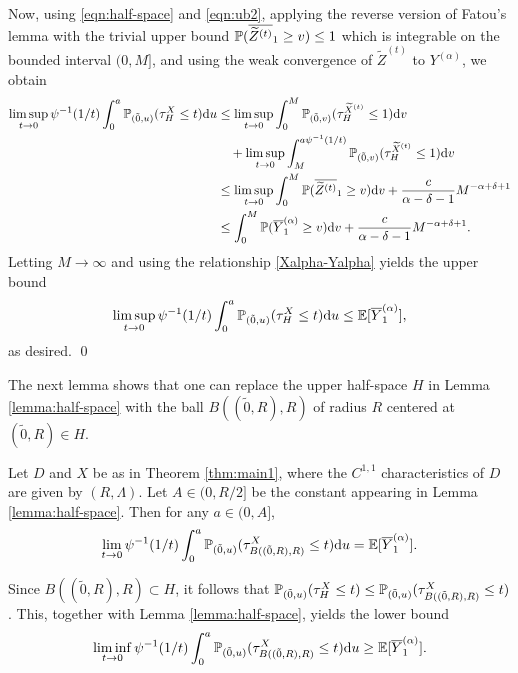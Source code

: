 \documentclass[11pt]{article}
\begin{document}
\begin{doublespace}
Now, using \eqref{eqn:half-space} and \eqref{eqn:ub2}, applying the reverse version of Fatou's lemma with the trivial upper bound $\P(\overline{\widetilde{Z}^{(t)}}_1\geq v)\leq 1$ which is integrable on the bounded interval $(0,M]$, and using the weak convergence of $\widetilde{Z}^{(t)}$ to $Y^{(\alpha)}$, we obtain
\begin{align*}
\limsup_{t\to 0}\psi^{-1}(1/t)\int_{0}^{a}\P_{(\tilde{0},u)}(\tau_{H}^X \leq t)\ud u
&\le \limsup_{t\to 0}\int_0^{M}\P_{(\tilde{0},v)}(\tau_{H}^{\widetilde{X}^{(t)}}\leq  1)\ud v\\ 
&\quad +\limsup_{t\to 0}\int_{M}^{a\psi^{-1}(1/t)}\P_{(\tilde{0},v)}(\tau_{H}^{\widetilde{X}^{(t)}}\leq  1)\ud v\\
&\le\limsup_{t\to 0} \int_{0}^{M}\P(\overline{\widetilde{Z}^{(t)}}_1\geq v)\ud v +\frac{c}{\alpha-\delta-1}M^{-\alpha+\delta+1}\\
&\le\int_{0}^{M}\P(\overline{Y}_{1}^{(\alpha)}\geq v)\ud v +\frac{c}{\alpha-\delta-1}M^{-\alpha+\delta+1}.
\end{align*}
Letting $M\to \infty$ and using the relationship \eqref{Xalpha-Yalpha} yields the upper bound
\begin{align*}
\limsup_{t\to 0}\psi^{-1}(1/t)\int_{0}^{a}\P_{(\tilde{0},u)}(\tau_{H}^X\leq t)\ud u\leq \E[\overline{Y}_{1}^{(\alpha)}],
\end{align*}
as desired.
\qed


The next lemma shows that one can replace the upper half-space $H$ in Lemma \ref{lemma:half-space} with the ball $B((\tilde{0},R),R)$ of radius $R$ centered at $(\tilde{0},R)\in H$. 
\begin{lemma}\label{lemma:ball}
Let $D$ and $X$ be as in Theorem \ref{thm:main1}, where the $C^{1,1}$ characteristics of $D$ are given by $(R,\Lambda)$. 
Let $A\in(0,R/2]$ be the constant appearing in Lemma \ref{lemma:half-space}.
Then for any $a\in(0, A ]$,
\[
\lim_{t\to 0}\psi^{-1}(1/t)\int_{0}^{a}\P_{(\tilde{0},u)}(\tau^{X}_{B((\tilde{0},R),R)}\leq t)\ud u=\E[\overline{Y}^{(\alpha)}_{1}].
\]
\end{lemma}
\pf
Since $B((\tilde{0},R),R)\subset H$, it follows that $\P_{(\tilde{0},u)}(\tau_{H}^X\leq t) \leq \P_{(\tilde{0},u)}(\tau^{X}_{B((\tilde{0},R),R)}\leq t)$. This, together with Lemma \ref{lemma:half-space}, yields the lower bound
\[
\liminf_{t\to 0}\psi^{-1}(1/t)\int_{0}^{a}\P_{(\tilde{0},u)}(\tau^{X}_{B((\tilde{0},R),R)} \le t)\ud u\geq \E[\overline{Y}^{(\alpha)}_{1}].
\]


\end{doublespace}
\end{document}
